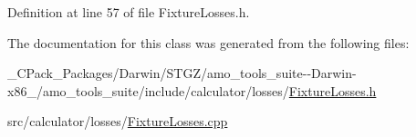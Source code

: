 Definition at line 57 of file Fixture\+Losses.\+h.



The documentation for this class was generated from the following files\+:\begin{DoxyCompactItemize}
\item 
\+\_\+\+C\+Pack\+\_\+\+Packages/\+Darwin/\+S\+T\+G\+Z/amo\+\_\+tools\+\_\+suite-\/-\/\+Darwin-\/x86\+\_/amo\+\_\+tools\+\_\+suite/include/calculator/losses/\hyperlink{___c_pack___packages_2_darwin_2_s_t_g_z_2amo__tools__suite--_darwin-x86__64_2amo__tools__suite_213ce320545ff913138db2e645210ad8a}{Fixture\+Losses.\+h}\item 
src/calculator/losses/\hyperlink{_fixture_losses_8cpp}{Fixture\+Losses.\+cpp}\end{DoxyCompactItemize}
